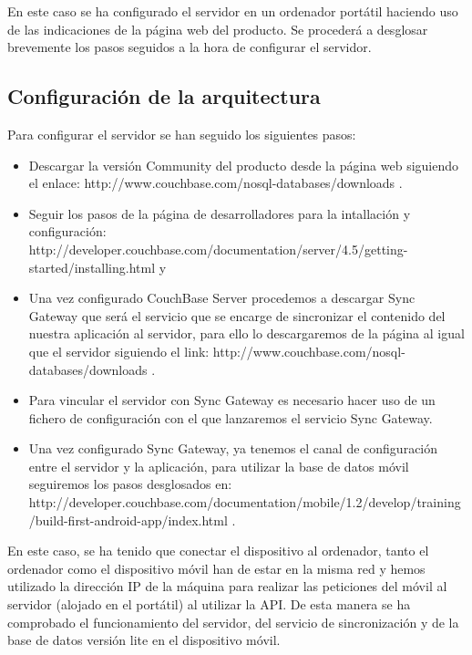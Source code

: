 En este caso se ha configurado el servidor en un ordenador portátil haciendo uso de las indicaciones de la página web del producto. Se procederá a desglosar brevemente los pasos seguidos a la hora de configurar el servidor.


\subsection{Configuración de la arquitectura}

Para configurar el servidor se han seguido los siguientes pasos: 


\begin{itemize}
\item Descargar la versión Community del producto desde la página web siguiendo el enlace: http://www.couchbase.com/nosql-databases/downloads . 
\item Seguir los pasos de la página de desarrolladores para la intallación y configuración: http://developer.couchbase.com/documentation/server/4.5/getting-started/installing.html y 
\item Una vez configurado CouchBase Server procedemos a descargar Sync Gateway que será el servicio que se encarge de sincronizar el contenido del nuestra aplicación al servidor, para ello lo descargaremos de la página al igual que el servidor siguiendo el link: http://www.couchbase.com/nosql-databases/downloads .
\item Para vincular el servidor con Sync Gateway es necesario hacer uso de un fichero de configuración con el que lanzaremos el servicio Sync Gateway.
\item Una vez configurado Sync Gateway, ya tenemos el canal de configuración entre el servidor y la aplicación, para utilizar la base de datos móvil seguiremos los pasos desglosados en: http://developer.couchbase.com/documentation/mobile/1.2/develop/training/build-first-android-app/index.html .
\end{itemize}


En este caso, se ha tenido que conectar el dispositivo al ordenador, tanto el ordenador como el dispositivo móvil han de estar en la misma red y hemos utilizado la dirección IP de la máquina para realizar las peticiones del móvil al servidor (alojado en el portátil) al utilizar la API. De esta manera se ha comprobado el funcionamiento del servidor, del servicio de sincronización y de la base de datos versión lite en el dispositivo móvil.


